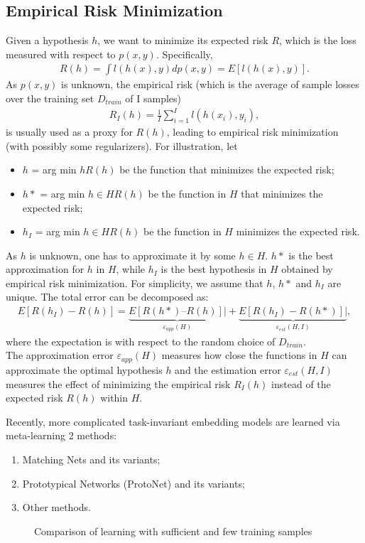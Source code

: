 \documentclass[12pt]{informs4}
\begin{document}
\subsection{Empirical Risk Minimization}
Given a hypothesis $h$, we want to minimize its expected risk $R$, which is the loss measured with respect to $p(x,y)$. Specifically,
\begin{gather}
R(h)=\int l(h(x),y)dp(x,y)= E[l(h(x),y)]. \label{3}
\end{gather}
As $p(x,y)$ is unknown, the empirical risk (which is the average of sample losses over the training set $D_{train}$ of I samples)
\begin{gather}
R_I(h)=\frac{1}{I}\sum^I_{i=1}l(h(x_i), y_i), \label{4}
\end{gather}
is usually used as a proxy for $R(h)$, leading to empirical risk minimization (with possibly some regularizers). For illustration, let
\begin{itemize}
\item $h$ = arg min $h R(h)$ be the function that minimizes the expected risk;
\item $h*$ = arg min $h \in H R(h)$ be the function in $H$ that minimizes the expected risk;
\item $h_I$ = arg min $h \in H R(h)$ be the function in $H$ minimizes the expected risk.
\end{itemize}
As $h$ is unknown, one has to approximate it by some $h \in H$. $h*$ is the best approximation for $h$ in $H$, while $h_I$ is the best hypothesis in $H$ obtained by empirical risk minimization. For simplicity, we assume that $h$, $h*$ and $h_I$ are unique. The total error can be decomposed as:
\begin{gather}
E[R(h_I)-R(h)]=\underbrace{E[R(h*)–R(h)]|}_{\varepsilon_{app}(H)}+\underbrace{E[R(h_I)-R(h*)]|}_{\varepsilon_{est}(H, I)}, \label{5}
\end{gather}
where the expectation is with respect to the random choice of $D_{train}$.\\

The approximation error $\varepsilon_{app}(H)$ measures how close the functions in $H$ can approximate the optimal hypothesis $h$ and the estimation error $\varepsilon_{est}(H, I)$ measures the effect of minimizing the empirical risk $R_I(h)$ instead of the expected risk $R(h)$ within $H$.

Recently, more complicated task-invariant embedding models are learned via meta-learning 2 methods:
\begin{enumerate}
\item Matching Nets and its variants;
\item Prototypical Networks (ProtoNet) and its variants;
\item Other methods.
\end{enumerate}
\begin{figure}[H]
\caption{Comparison of learning with sufficient and few training samples}
\label{f1}
\end{figure}
\end{document}
